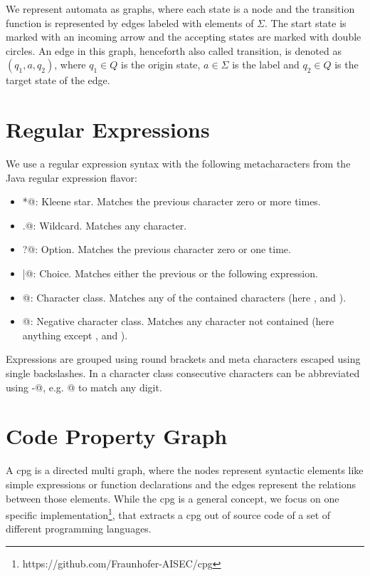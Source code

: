 We represent automata as graphs, where each state is a node and the transition function is represented by edges labeled with elements of $\Sigma$. The start state is marked with an incoming arrow and the accepting states are marked with double circles.
An edge in this graph, henceforth also called transition, is denoted as $(q_1, a, q_2)$, where $q_1 \in Q$ is the origin state, $a \in \Sigma$ is the label and $q_2 \in Q$ is the target state of the edge.

\section{Regular Expressions}\label{sec:background:regex}

We use a regular expression syntax with the following metacharacters from the Java regular expression flavor:

\begin{itemize}
	\item \Verb@*@: Kleene star. Matches the previous character zero or more times.
	\item \Verb@.@: Wildcard. Matches any character.
	\item \Verb@?@: Option. Matches the previous character zero or one time.
	\item \Verb@|@: Choice. Matches either the previous or the following expression.
	\item \Verb@[abc]@: Character class. Matches any of the contained characters (here \Verb@a@, \Verb@b@ and \Verb@c@).
	\item \Verb@[^abc]@: Negative character class. Matches any character not contained (here anything except \Verb@a@, \Verb@b@ and \Verb@c@).
\end{itemize}

Expressions are grouped using round brackets and meta characters escaped using single backslashes.
In a character class consecutive characters can be abbreviated using \Verb@-@, e.g. \Verb@[0-9]@ to match any digit.

\section{Code Property Graph}\label{sec:background:cpg}
A \acf{cpg} is a directed multi graph, where the nodes represent syntactic elements like simple expressions or function declarations and the edges represent the relations between those elements.
While the \ac{cpg} is a general concept, we focus on one specific implementation\footnote{https://github.com/Fraunhofer-AISEC/cpg}, that extracts a \ac{cpg} out of source code of a set of different programming languages.

